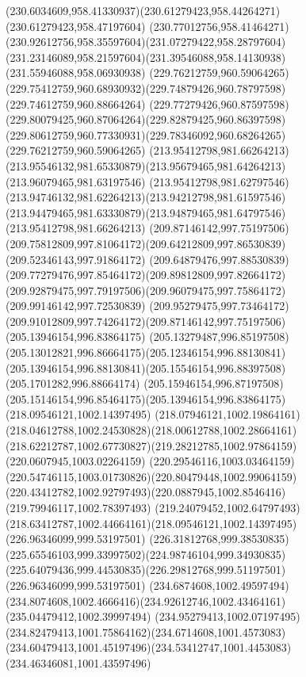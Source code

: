 {{	\curveto(230.6034609,958.41330937)(230.61279423,958.44264271)(230.61279423,958.47197604)
	\curveto(230.77012756,958.41464271)(230.92612756,958.35597604)(231.07279422,958.28797604)
	\curveto(231.23146089,958.21597604)(231.39546088,958.14130938)(231.55946088,958.06930938)
	\moveto(229.76212759,960.59064265)
	\curveto(229.75412759,960.68930932)(229.74879426,960.78797598)(229.74612759,960.88664264)
	\curveto(229.77279426,960.87597598)(229.80079425,960.87064264)(229.82879425,960.86397598)
	\curveto(229.80612759,960.77330931)(229.78346092,960.68264265)(229.76212759,960.59064265)
	\moveto(213.95412798,981.66264213)
	\curveto(213.95546132,981.65330879)(213.95679465,981.64264213)(213.96079465,981.63197546)
	\curveto(213.95412798,981.62797546)(213.94746132,981.62264213)(213.94212798,981.61597546)
	\curveto(213.94479465,981.63330879)(213.94879465,981.64797546)(213.95412798,981.66264213)
	\moveto(209.87146142,997.75197506)
	\curveto(209.75812809,997.81064172)(209.64212809,997.86530839)(209.52346143,997.91864172)
	\curveto(209.64879476,997.88530839)(209.77279476,997.85464172)(209.89812809,997.82664172)
	\curveto(209.92879475,997.79197506)(209.96079475,997.75864172)(209.99146142,997.72530839)
	\curveto(209.95279475,997.73464172)(209.91012809,997.74264172)(209.87146142,997.75197506)
	\moveto(205.13946154,996.83864175)
	\curveto(205.13279487,996.85197508)(205.13012821,996.86664175)(205.12346154,996.88130841)
	\curveto(205.13946154,996.88130841)(205.15546154,996.88397508)(205.1701282,996.88664174)
	\curveto(205.15946154,996.87197508)(205.15146154,996.85464175)(205.13946154,996.83864175)
	\moveto(218.09546121,1002.14397495)
	\curveto(218.07946121,1002.19864161)(218.04612788,1002.24530828)(218.00612788,1002.28664161)
	\curveto(218.62212787,1002.67730827)(219.28212785,1002.97864159)(220.0607945,1003.02264159)
	\curveto(220.29546116,1003.03464159)(220.54746115,1003.01730826)(220.80479448,1002.99064159)
	\curveto(220.43412782,1002.92797493)(220.0887945,1002.8546416)(219.79946117,1002.78397493)
	\curveto(219.24079452,1002.64797493)(218.63412787,1002.44664161)(218.09546121,1002.14397495)
	\moveto(226.96346099,999.53197501)
	\curveto(226.31812768,999.38530835)(225.65546103,999.33997502)(224.98746104,999.34930835)
	\curveto(225.64079436,999.44530835)(226.29812768,999.51197501)(226.96346099,999.53197501)
	\moveto(234.6874608,1002.49597494)
	\curveto(234.8074608,1002.4666416)(234.92612746,1002.43464161)(235.04479412,1002.39997494)
	\curveto(234.95279413,1002.07197495)(234.82479413,1001.75864162)(234.6714608,1001.4573083)
	\curveto(234.60479413,1001.45197496)(234.53412747,1001.4453083)(234.46346081,1001.43597496)
}}
